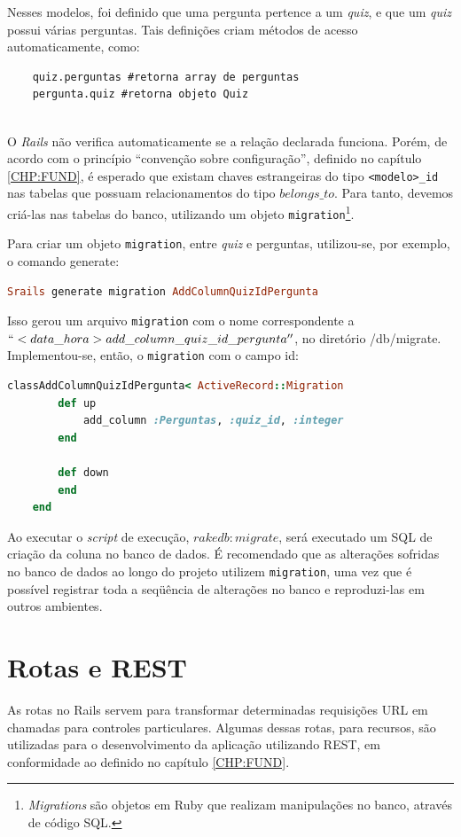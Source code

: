     Nesses modelos, foi definido que uma pergunta pertence a um \emph{quiz}, e que um \emph{quiz} possui várias perguntas. Tais definições criam métodos de acesso automaticamente, como:
	
\begin{lstlisting}   
	quiz.perguntas #retorna array de perguntas
	pergunta.quiz #retorna objeto Quiz
	
\end{lstlisting}     

    O \emph{Rails} não verifica automaticamente se a relação declarada funciona. Porém, de acordo com o princípio ``convenção sobre configuração'', definido no capítulo \ref{CHP:FUND}, é esperado que existam chaves estrangeiras do tipo \texttt{<modelo>\_id} nas tabelas que possuam relacionamentos do tipo $belongs\_to$. Para tanto, devemos criá-las nas tabelas do banco, utilizando um objeto \texttt{migration}\footnote{\emph{Migrations} são objetos em Ruby que realizam manipulações no banco, através de código SQL.}.
	
            Para criar um objeto \texttt{migration}, entre \emph{quiz} e perguntas, utilizou-se, por exemplo, o comando generate:
\begin{lstlisting}[language=Ruby]			
    Srails generate migration AddColumnQuizIdPergunta
 \end{lstlisting}   
       
    Isso gerou um arquivo \texttt{migration}  com o nome correspondente a $``<data\_hora> add\_column\_quiz\_id\_pergunta''$, no diretório /db/migrate. Implementou-se, então, o \texttt{migration} com o campo id:
	
\begin{lstlisting}[language=Ruby]
    classAddColumnQuizIdPergunta< ActiveRecord::Migration
    	def up
    	    add_column :Perguntas, :quiz_id, :integer
    	end
     
    	def down
    	end
    end
 \end{lstlisting}    
 
    Ao executar o \emph{script} de execução, $rake db:migrate$, será executado um SQL de criação da coluna no banco de dados. É recomendado que as alterações sofridas no banco de dados ao longo do projeto utilizem \texttt{migration}, uma vez que é possível registrar toda a seqüência de alterações no banco e reproduzi-las em outros ambientes.
     
     
    \section{Rotas e REST}
            As rotas no Rails servem para transformar determinadas requisições \ac{URL} em chamadas para controles particulares.  Algumas dessas rotas, para recursos, são utilizadas para o desenvolvimento da aplicação utilizando \ac{REST}, em conformidade ao definido no capítulo \ref{CHP:FUND}.
			
